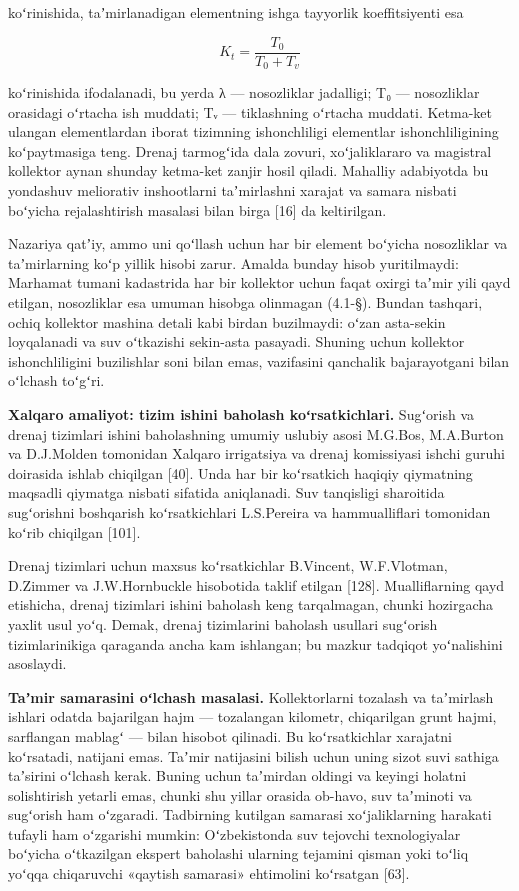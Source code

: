koʻrinishida, taʼmirlanadigan elementning ishga tayyorlik koeffitsiyenti
esa

\begin{equation}\tag{1.2}
K_t = \frac{T_0}{T_0 + T_v}
\end{equation}

koʻrinishida ifodalanadi, bu yerda λ --- nosozliklar jadalligi; T₀ ---
nosozliklar orasidagi oʻrtacha ish muddati; Tᵥ --- tiklashning oʻrtacha
muddati. Ketma-ket ulangan elementlardan iborat tizimning ishonchliligi
elementlar ishonchliligining koʻpaytmasiga teng. Drenaj tarmogʻida dala
zovuri, xoʻjaliklararo va magistral kollektor aynan shunday ketma-ket
zanjir hosil qiladi. Mahalliy adabiyotda bu yondashuv meliorativ
inshootlarni taʼmirlashni xarajat va samara nisbati boʻyicha
rejalashtirish masalasi bilan birga {[}16{]} da keltirilgan.

Nazariya qatʼiy, ammo uni qoʻllash uchun har bir element boʻyicha
nosozliklar va taʼmirlarning koʻp yillik hisobi zarur. Amalda bunday
hisob yuritilmaydi: Marhamat tumani kadastrida har bir kollektor uchun
faqat oxirgi taʼmir yili qayd etilgan, nosozliklar esa umuman hisobga
olinmagan (4.1-§). Bundan tashqari, ochiq kollektor mashina detali kabi
birdan buzilmaydi: oʻzan asta-sekin loyqalanadi va suv oʻtkazishi
sekin-asta pasayadi. Shuning uchun kollektor ishonchliligini buzilishlar
soni bilan emas, vazifasini qanchalik bajarayotgani bilan oʻlchash
toʻgʻri.

\textbf{Xalqaro amaliyot: tizim ishini baholash koʻrsatkichlari.}
Sugʻorish va drenaj tizimlari ishini baholashning umumiy uslubiy asosi
M.G.Bos, M.A.Burton va D.J.Molden tomonidan Xalqaro irrigatsiya va
drenaj komissiyasi ishchi guruhi doirasida ishlab chiqilgan {[}40{]}.
Unda har bir koʻrsatkich haqiqiy qiymatning maqsadli qiymatga nisbati
sifatida aniqlanadi. Suv tanqisligi sharoitida sugʻorishni boshqarish
koʻrsatkichlari L.S.Pereira va hammualliflari tomonidan koʻrib chiqilgan
{[}101{]}.

Drenaj tizimlari uchun maxsus koʻrsatkichlar B.Vincent, W.F.Vlotman,
D.Zimmer va J.W.Hornbuckle hisobotida taklif etilgan {[}128{]}.
Mualliflarning qayd etishicha, drenaj tizimlari ishini baholash keng
tarqalmagan, chunki hozirgacha yaxlit usul yoʻq. Demak, drenaj
tizimlarini baholash usullari sugʻorish tizimlarinikiga qaraganda ancha
kam ishlangan; bu mazkur tadqiqot yoʻnalishini asoslaydi.

\textbf{Taʼmir samarasini oʻlchash masalasi.} Kollektorlarni tozalash va
taʼmirlash ishlari odatda bajarilgan hajm --- tozalangan kilometr,
chiqarilgan grunt hajmi, sarflangan mablagʻ --- bilan hisobot qilinadi.
Bu koʻrsatkichlar xarajatni koʻrsatadi, natijani emas. Taʼmir natijasini
bilish uchun uning sizot suvi sathiga taʼsirini oʻlchash kerak. Buning
uchun taʼmirdan oldingi va keyingi holatni solishtirish yetarli emas,
chunki shu yillar orasida ob-havo, suv taʼminoti va sugʻorish ham
oʻzgaradi. Tadbirning kutilgan samarasi xoʻjaliklarning harakati tufayli
ham oʻzgarishi mumkin: Oʻzbekistonda suv tejovchi texnologiyalar
boʻyicha oʻtkazilgan ekspert baholashi ularning tejamini qisman yoki
toʻliq yoʻqqa chiqaruvchi «qaytish samarasi» ehtimolini koʻrsatgan
{[}63{]}.

